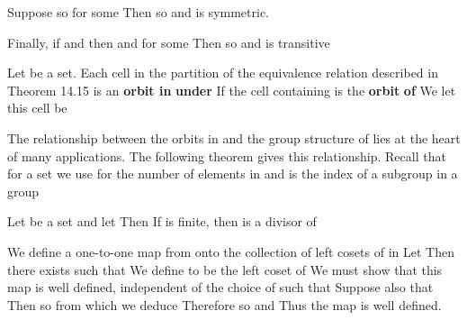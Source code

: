\documentclass[11pt,oneside]{article}
\begin{document}
\begin{BookBody}
Suppose  so  for some  Then   so  and \BookInline{\sim } is symmetric.

Finally, if  and  then  and  for some  Then  so  and \BookInline{\sim } is transitive\BookEnd{\blacklozenge}

 Let  be a set. Each cell in the partition of the equivalence relation described in Theorem 14.15 is an\textbf{ orbit in}  \textbf{under}  If  the cell containing  is the\textbf{ orbit} \textbf{of}  We let this cell be \BookEnd{\blacksquare}

The relationship between the orbits in  and the group structure of  lies at the heart of many applications. The following theorem gives this relationship. Recall that for a set  we use  for the number of elements in  and  is the index of a subgroup  in a group 

 Let  be a set and let  Then  If  is finite, then  is a divisor of 

 We define a one-to-one map \BookInline{\psi } from  onto the collection of left cosets of  in  Let  Then there exists  such that  We define  to be the left coset  of  We must show that this map \BookInline{\psi } is well defined, independent of the choice of  such that  Suppose also that  Then so  from which we deduce  Therefore  so  and  Thus the map \BookInline{\psi } is well defined.


\end{BookBody}
\end{document}

